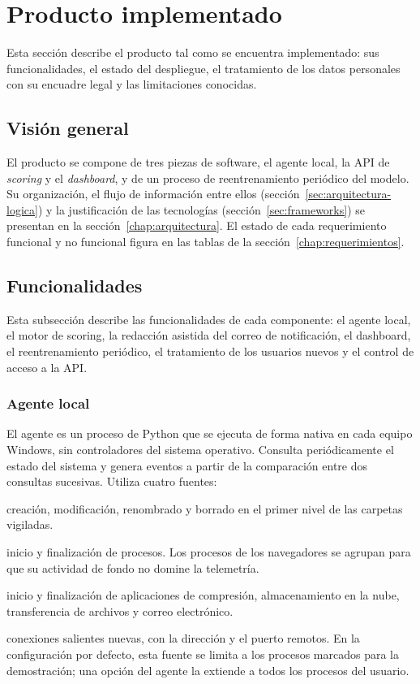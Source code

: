 \chapter{Producto implementado}
\label{chap:producto}

Esta sección describe el producto tal como se encuentra implementado: sus funcionalidades, el estado del despliegue, el tratamiento de los datos personales con su encuadre legal y las limitaciones conocidas.
\section{Visión general}
\label{sec:vision-producto}
El producto se compone de tres piezas de software, el agente local, la API de \emph{scoring} y el \emph{dashboard}, y de un proceso de reentrenamiento periódico del modelo. Su organización, el flujo de información entre ellos (sección~\ref{sec:arquitectura-logica}) y la justificación de las tecnologías (sección~\ref{sec:frameworks}) se presentan en la sección~\ref{chap:arquitectura}. El estado de cada requerimiento funcional y no funcional figura en las tablas de la sección~\ref{chap:requerimientos}.

\section{Funcionalidades}
\label{sec:funcionalidades}

Esta subsección describe las funcionalidades de cada componente: el agente local, el motor de scoring, la redacción asistida del correo de notificación, el dashboard, el reentrenamiento periódico, el tratamiento de los usuarios nuevos y el control de acceso a la API.
\subsection{Agente local}
El agente es un proceso de Python que se ejecuta de forma nativa en cada equipo Windows, sin controladores del sistema operativo. Consulta periódicamente el estado del sistema y genera eventos a partir de la comparación entre dos consultas sucesivas. Utiliza cuatro fuentes:
\begin{description}[leftmargin=0pt, itemsep=2pt]
	\item[Archivos:] creación, modificación, renombrado y borrado en el primer nivel de las carpetas vigiladas.
	\item[Procesos:] inicio y finalización de procesos. Los procesos de los navegadores se agrupan para que su actividad de fondo no domine la telemetría.
	\item[Aplicaciones sensibles:] inicio y finalización de aplicaciones de compresión, almacenamiento en la nube, transferencia de archivos y correo electrónico.
	\item[Red:] conexiones salientes nuevas, con la dirección y el puerto remotos. En la configuración por defecto, esta fuente se limita a los procesos marcados para la demostración; una opción del agente la extiende a todos los procesos del usuario.
\end{description}

